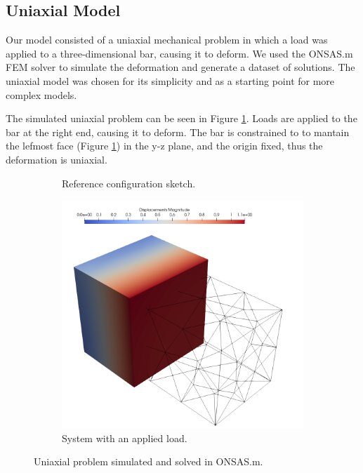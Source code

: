 \documentclass[11pt]{scrartcl} %
\begin{document}
\subsection{Uniaxial Model}
Our model consisted of a uniaxial mechanical problem in which a load was applied to a three-dimensional bar, causing it to deform. We used the ONSAS.m FEM solver to simulate the deformation and generate a dataset of solutions. The uniaxial model was chosen for its simplicity and as a starting point for more complex models.

The simulated uniaxial problem can be seen in Figure \ref{fig:uniaxial_model}. Loads are applied to the bar at the right end, causing it to deform. The bar is constrained to to mantain the lefmost face (Figure \ref{fig:uniaxial_model}) in the y-z plane, and the origin fixed, thus the deformation is uniaxial.

\begin{figure}[h]
	\centering
	\begin{subfigure}[b]{0.48\textwidth}
	\def\svgwidth{\textwidth}
	
	\caption{Reference configuration sketch.}
	\end{subfigure}
	\hfill
	\begin{subfigure}[b]{0.48\textwidth}
	\centering
		\includegraphics[width=\textwidth]{Figures/Example1.png}
	\caption{System with an applied load.}
	\end{subfigure}
	\caption{Uniaxial problem simulated and solved in ONSAS.m.}
	\label{fig:uniaxial_model}
\end{figure}
\end{document}
